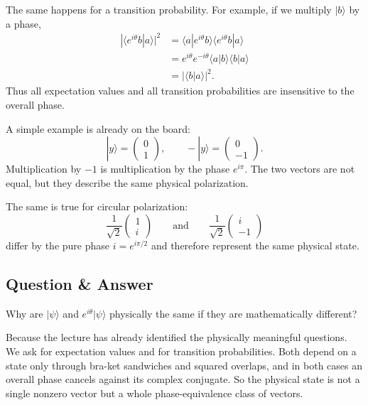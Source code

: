 The same happens for a transition probability. For example, if we multiply $|b\rangle$ by a phase,
\begin{align}
|\langle e^{i\theta}b|a\rangle|^2
&=
\langle a|e^{i\theta}b\rangle\langle e^{i\theta}b|a\rangle \\
&=
e^{i\theta}e^{-i\theta}\langle a|b\rangle\langle b|a\rangle \\
&=
|\langle b|a\rangle|^2.
\end{align}
Thus all expectation values and all transition probabilities are insensitive to the overall phase.

A simple example is already on the board:
\begin{equation}
|y\rangle=
\begin{pmatrix}
0\\
1
\end{pmatrix},
\qquad
-|y\rangle=
\begin{pmatrix}
0\\
-1
\end{pmatrix}.
\end{equation}
Multiplication by $-1$ is multiplication by the phase $e^{i\pi}$. The two vectors are not equal, but they describe the same physical polarization.

The same is true for circular polarization:
\begin{equation}
\frac{1}{\sqrt2}
\begin{pmatrix}
1\\
i
\end{pmatrix}
\qquad\text{and}\qquad
\frac{1}{\sqrt2}
\begin{pmatrix}
i\\
-1
\end{pmatrix}
\end{equation}
differ by the pure phase $i=e^{i\pi/2}$ and therefore represent the same physical state.

\subsection{Question \& Answer}

Why are $|\psi\rangle$ and $e^{i\theta}|\psi\rangle$ physically the same if they are mathematically different?

Because the lecture has already identified the physically meaningful questions. We ask for expectation values and for transition probabilities. Both depend on a state only through bra-ket sandwiches and squared overlaps, and in both cases an overall phase cancels against its complex conjugate. So the physical state is not a single nonzero vector but a whole phase-equivalence class of vectors.


